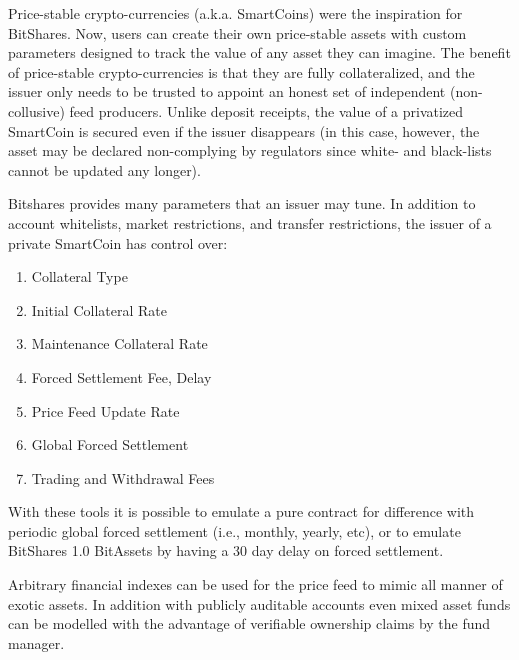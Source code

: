\label{sec:uia:priv}

Price-stable crypto-currencies (a.k.a. SmartCoins) were the inspiration for
BitShares. Now, users can create their own price-stable assets with custom
parameters designed to track the value of any asset they can imagine. The
benefit of price-stable crypto-currencies is that they are fully
collateralized, and the issuer only needs to be trusted to appoint an honest
set of independent (non-collusive) feed producers. Unlike deposit receipts, the
value of a privatized SmartCoin is secured even if the issuer disappears (in
this case, however, the asset may be declared non-complying by regulators since
white- and black-lists cannot be updated any longer).

Bitshares provides many parameters that an issuer may tune. In addition to
account whitelists, market restrictions, and transfer restrictions, the issuer
of a private SmartCoin has control over:

\begin{enumerate}
 \item Collateral Type
 \item Initial Collateral Rate
 \item Maintenance Collateral Rate
 \item Forced Settlement Fee, Delay %
 \item Price Feed Update Rate
 \item Global Forced Settlement
 \item Trading and Withdrawal Fees
\end{enumerate}

With these tools it is possible to emulate a pure contract for difference with
periodic global forced settlement (i.e., monthly, yearly, etc), or to emulate
BitShares 1.0 BitAssets by having a 30 day delay on forced settlement.

Arbitrary financial indexes can be used for the price feed to mimic all manner
of exotic assets. In addition with publicly auditable accounts even mixed asset
funds can be modelled with the advantage of verifiable ownership claims by the
fund manager.
